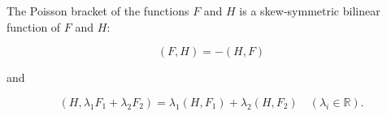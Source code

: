 The Poisson bracket of the functions $F$ and $H$ is a skew-symmetric bilinear function of $F$ and $H$:

$$(F, H) = -(H, F)$$

and

$$(H, \lambda_1 F_1 + \lambda_2 F_2) = \lambda_1 (H, F_1) + \lambda_2 (H, F_2) \quad (\lambda_i \in \mathbb{R}).$$

